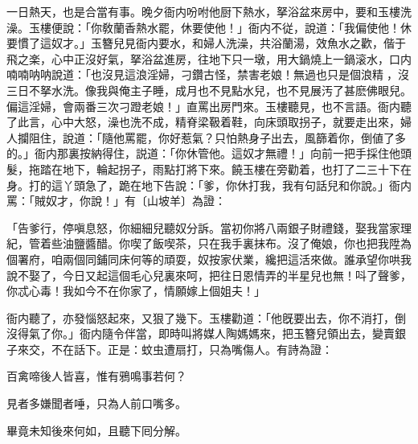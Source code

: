 一日熱天，也是合當有事。晚夕衙内吩咐他厨下熱水，拏浴盆來房中，要和玉樓洗澡。玉樓便說：「你敎蘭香熱水罷，休要使他！」衙内不従，說道：「我偏使他！休要慣了這奴才。」玉簪兒見衙内要水，和婦人洗澡，共浴蘭湯，效魚水之歡，偕于飛之楽，心中正沒好氣，拏浴盆進房，往地下只一墩，用大鍋燒上一鍋滚水，口内喃喃呐呐說道：「也沒見這浪淫婦，刁鑽古怪，禁害老娘！無過也只是個浪精𣭈，沒三日不拏水洗。像我與俺主子睡，成月也不見點水兒，也不見展汚了甚麽佛眼兒。偏這淫婦，會兩番三次刁蹬老娘！」直罵出房門來。玉樓聽見，也不言語。衙内聽了此言，心中大怒，澡也洗不成，精脊梁靸着鞋，向床頭取拐子，就要走出來，婦人攔阻住，說道：「隨他罵罷，你好惹氣？只怕熱身子出去，風篩着你，倒値了多的。」衙内那裏按納得住，説道：「你休管他。這奴才無禮！」向前一把手採住他頭髮，拖踏在地下，輪起拐子，雨點打將下來。饒玉樓在旁勸着，也打了二三十下在身。打的這丫頭急了，跪在地下告說：「爹，你休打我，我有句話兒和你說。」衙内罵：「賊奴才，你說！」有〔山坡羊〕為證：

\begin{myquote}
「告爹行，停嗔息怒，你細細兒聽奴分訴。當初你將八兩銀子財禮錢，娶我當家理紀，管着些油鹽醬醋。你喫了飯喫茶，只在我手裏抹布。沒了俺娘，你也把我陞為個署府，咱兩個同鋪同床何等的頑耍，奴按家伏業，纔把這活來做。誰承望你哄我說不娶了，今日又起這個毛心兒裏來呵，把往日恩情弄的半星兒也無！呌了聲爹，你忒心毒！我如今不在你家了，情願嫁上個姐夫！」
\end{myquote}

衙内聽了，亦發惱怒起來，又狠了幾下。玉樓勸道：「他旣要出去，你不消打，倒沒得氣了你。」衙内隨令伴當，即時叫將媒人陶媽媽來，把玉簪兒領出去，變賣銀子來交，不在話下。正是：蚊虫遭扇打，只為嘴傷人。有詩為證：

\begin{myquote}
百禽啼後人皆喜，惟有鴉鳴事若何？

見者多嫌聞者唾，只為人前口嘴多。
\end{myquote}

畢竟未知後來何如，且聽下囘分解。

